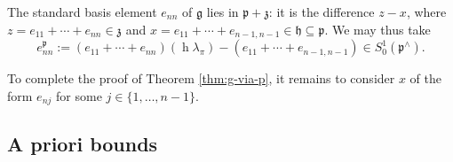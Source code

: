 \documentclass[reqno]{amsart}
\DeclareMathOperator{\h}{h}
\theoremstyle{plain} \newtheorem{theorem} {Theorem}
\theoremstyle{definition} \newtheorem{definition} [theorem] {Definition}
\theoremstyle{itplain} %
\numberwithin{equation}{section}
\numberwithin{theorem}{section}
\begin{document}
The standard basis element $e_{n n}$ of $\mathfrak{g}$ lies in $\mathfrak{p} + \mathfrak{z}$: it is the difference $z - x$, where $z = e_{1 1} + \dotsb + e_{n n} \in \mathfrak{z}$ and $x = e_{1 1} + \dotsb + e_{n-1,n-1} \in \mathfrak{h} \subseteq \mathfrak{p}$.  We may thus take
\[
  e_{n n}^{\mathfrak{p}} := (e_{1 1} + \dotsb + e_{n n})(\h \lambda_\pi) - (e_{1 1} + \dotsb + e_{n-1,n-1}) \in S^1_0(\mathfrak{p}^\wedge).
\]

To complete the proof of Theorem \ref{thm:g-via-p}, it remains to consider $x$ of the form $e_{n j}$ for some $j \in \{1,\dotsc, n-1\}$.


\subsection{A priori bounds}\label{sec:empha-priori-bounds}
\end{document}
